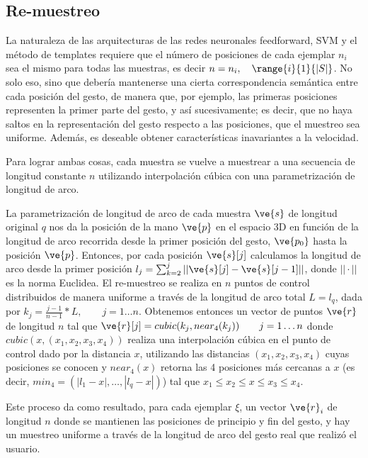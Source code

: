 


\subsection{Re-muestreo}


La naturaleza de las arquitecturas de las redes neuronales feedforward, SVM y el método de templates requiere que el número de posiciones de cada ejemplar $n_i$ sea el mismo para todas las muestras, es decir $n=n_i, \quad \range{i}{1}{|S|}$. No solo eso, sino que 	debería mantenerse una cierta correspondencia semántica entre cada posición del gesto, de manera que, por ejemplo, las primeras posiciones representen la primer parte del gesto, y así sucesivamente; es decir, que no haya saltos en la representación del gesto respecto a las posiciones, que el muestreo sea uniforme. Además, es deseable obtener características inavariantes a la velocidad. 

Para lograr ambas cosas, cada muestra se vuelve a muestrear a una secuencia de longitud constante $n$ utilizando interpolación cúbica con una parametrización de longitud de arco. 

La parametrización de longitud de arco de cada muestra $\ve{s}$ de longitud original $q$ nos da la posición de la mano $\ve{p}$ en el espacio 3D en función de la longitud de arco recorrida desde la primer posición del gesto, $\ve{p_0}$ hasta la posición $\ve{p}$. Entonces, por cada posición $\ve{s}[j]$  calculamos la longitud de arco desde la primer posición  $l_j=\sum_{k=2}^j || \ve{s}[j] - \ve{s}[j-1] || $, donde $||\cdot||$ es la norma Euclidea. El re-muestreo se realiza en $n$ puntos de control distribuidos de manera uniforme a través de la longitud de arco total $L=l_{q}$, dada por  $k_j=\frac{j-1}{n-1}*L, \qquad  j=1 \dots n$. Obtenemos entonces un vector de puntos $\ve{r}$ de longitud $n$ tal que $\ve{r}[j] = cubic(k_j,near_4(k_j))  \qquad  j=1 \dots n$ donde $cubic(x,(x_1, x_2, x_3, x_4))$ realiza una interpolación cúbica en el punto de control dado por la distancia $x$, utilizando las distancias $(x_1, x_2, x_3, x_4)$  cuyas posiciones se conocen y $near_4(x)$ retorna las 4 posiciones más cercanas a $x$ (es decir, $min_4=( |l_1-x|, \dots ,|l_q-x|)$) tal que $x_1 \leq x_2 \leq x \leq x_3 \leq x_4$.



Este proceso da como resultado, para cada ejemplar $\xi$, un vector $\ve{r}_i$ de longitud $n$ donde se mantienen las posiciones de principio y fin del gesto, y hay un muestreo uniforme a través de la longitud de arco del gesto real que realizó el usuario.